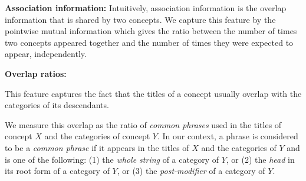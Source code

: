 
{\bf Association information:} Intuitively, association information is
the overlap information that is shared by two concepts. We capture
this feature by the pointwise mutual information which gives the ratio
between the number of times two concepts appeared together and the
number of times they were expected to appear, independently.



{\bf Overlap ratios:}  This
feature captures the fact that the titles of a concept usually overlap
with the categories of its descendants.    We measure this overlap as the ratio of
{\em common phrases} used in the titles of concept $X$ and the
categories of concept $Y$. In our context, a phrase is considered to
be a {\em common phrase} if it appears in the titles of $X$ and the
categories of $Y$ and is one of the following: (1) the {\em whole
  string} of a category of $Y$, or (2) the {\em head} in its root form
of a category of $Y$, or (3) the {\em post-modifier} of a category of
$Y$.

